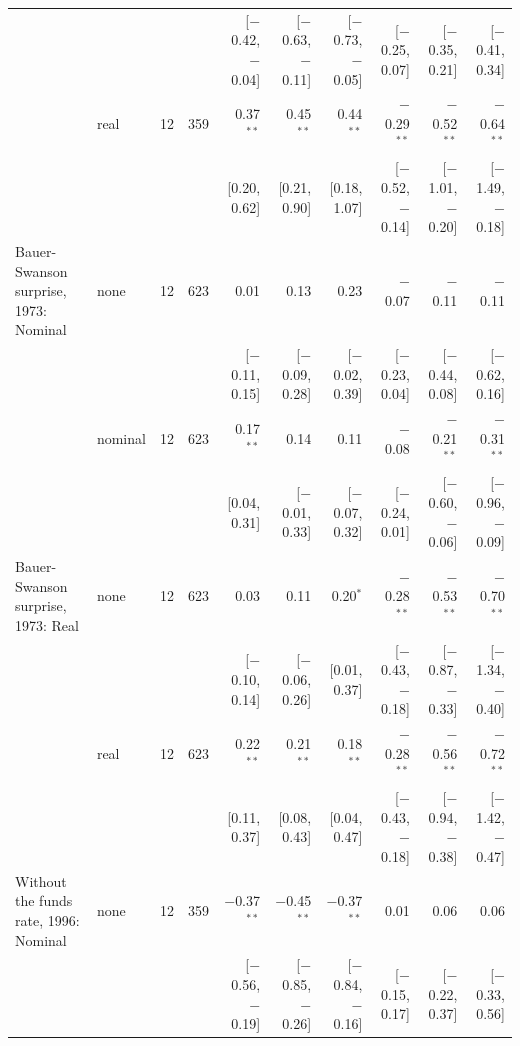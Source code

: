 \begin{table}[tp]
{\begin{tabular}{llcrrrrrrr}
 & & & & {\scriptsize [$-$0.42, $-$0.04]} & {\scriptsize [$-$0.63, $-$0.11]} & {\scriptsize [$-$0.73, $-$0.05]} & {\scriptsize [$-$0.25, 0.07]} & {\scriptsize [$-$0.35, 0.21]} & {\scriptsize [$-$0.41, 0.34]}\\
 & real & 12 & 359 & 0.37$^{**}$ & 0.45$^{**}$ & 0.44$^{**}$ & $-$0.29$^{**}$ & $-$0.52$^{**}$ & $-$0.64$^{**}$\\
 & & & & {\scriptsize [0.20, 0.62]} & {\scriptsize [0.21, 0.90]} & {\scriptsize [0.18, 1.07]} & {\scriptsize [$-$0.52, $-$0.14]} & {\scriptsize [$-$1.01, $-$0.20]} & {\scriptsize [$-$1.49, $-$0.18]}\\
\addlinespace
Bauer-Swanson surprise, 1973: Nominal & none & 12 & 623 & 0.01 & 0.13 & 0.23 & $-$0.07 & $-$0.11 & $-$0.11\\
 & & & & {\scriptsize [$-$0.11, 0.15]} & {\scriptsize [$-$0.09, 0.28]} & {\scriptsize [$-$0.02, 0.39]} & {\scriptsize [$-$0.23, 0.04]} & {\scriptsize [$-$0.44, 0.08]} & {\scriptsize [$-$0.62, 0.16]}\\
 & nominal & 12 & 623 & 0.17$^{**}$ & 0.14 & 0.11 & $-$0.08 & $-$0.21$^{**}$ & $-$0.31$^{**}$\\
 & & & & {\scriptsize [0.04, 0.31]} & {\scriptsize [$-$0.01, 0.33]} & {\scriptsize [$-$0.07, 0.32]} & {\scriptsize [$-$0.24, 0.01]} & {\scriptsize [$-$0.60, $-$0.06]} & {\scriptsize [$-$0.96, $-$0.09]}\\
\addlinespace
Bauer-Swanson surprise, 1973: Real & none & 12 & 623 & 0.03 & 0.11 & 0.20$^{*}$ & $-$0.28$^{**}$ & $-$0.53$^{**}$ & $-$0.70$^{**}$\\
 & & & & {\scriptsize [$-$0.10, 0.14]} & {\scriptsize [$-$0.06, 0.26]} & {\scriptsize [0.01, 0.37]} & {\scriptsize [$-$0.43, $-$0.18]} & {\scriptsize [$-$0.87, $-$0.33]} & {\scriptsize [$-$1.34, $-$0.40]}\\
 & real & 12 & 623 & 0.22$^{**}$ & 0.21$^{**}$ & 0.18$^{**}$ & $-$0.28$^{**}$ & $-$0.56$^{**}$ & $-$0.72$^{**}$\\
 & & & & {\scriptsize [0.11, 0.37]} & {\scriptsize [0.08, 0.43]} & {\scriptsize [0.04, 0.47]} & {\scriptsize [$-$0.43, $-$0.18]} & {\scriptsize [$-$0.94, $-$0.38]} & {\scriptsize [$-$1.42, $-$0.47]}\\
\addlinespace
Without the funds rate, 1996: Nominal & none & 12 & 359 & $-$0.37$^{**}$ & $-$0.45$^{**}$ & $-$0.37$^{**}$ & 0.01 & 0.06 & 0.06\\
 & & & & {\scriptsize [$-$0.56, $-$0.19]} & {\scriptsize [$-$0.85, $-$0.26]} & {\scriptsize [$-$0.84, $-$0.16]} & {\scriptsize [$-$0.15, 0.17]} & {\scriptsize [$-$0.22, 0.37]} & {\scriptsize [$-$0.33, 0.56]}\\

\end{tabular}}
\end{table}
